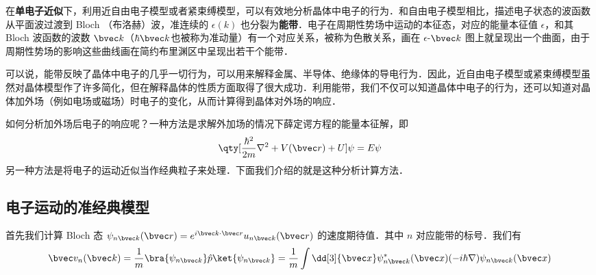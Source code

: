 
在\textbf{单电子近似}下，利用近自由电子模型或者紧束缚模型，可以有效地分析晶体中电子的行为．和自由电子模型相比，描述电子状态的波函数从平面波过渡到 Bloch （布洛赫）波，准连续的 $\epsilon(k)$ 也分裂为\textbf{能带}．电子在周期性势场中运动的本征态，对应的能量本征值 $\epsilon$，和其 Bloch 波函数的波数 $\bvec k$（$\hbar \bvec k$也被称为准动量）有一个对应关系，被称为色散关系，画在 $\epsilon$-${\bvec k}$ 图上就呈现出一个曲面，由于周期性势场的影响这些曲线画在简约布里渊区中呈现出若干个能带．

可以说，能带反映了晶体中电子的几乎一切行为，可以用来解释金属、半导体、绝缘体的导电行为．因此，近自由电子模型或紧束缚模型虽然对晶体模型作了许多简化，但在解释晶体的性质方面取得了很大成功．利用能带，我们不仅可以知道晶体中电子的行为，还可以知道对晶体加外场（例如电场或磁场）时电子的变化，从而计算得到晶体对外场的响应．

如何分析加外场后电子的响应呢？一种方法是求解外加场的情况下薛定谔方程的能量本征解，即
\begin{equation}
\qty[\frac{\hbar^2}{2m}\nabla^2+V(\bvec r)+U]\psi = E\psi
\end{equation}
另一种方法是将电子的运动近似当作经典粒子来处理．下面我们介绍的就是这种分析计算方法．
\subsection{电子运动的准经典模型}
首先我们计算 Bloch 态 $\psi_{n\bvec k}(\bvec r)=e^{i\bvec k\cdot \bvec r}u_{n\bvec k}(\bvec r)$ 的速度期待值．其中 $n$ 对应能带的标号．我们有
\begin{equation}
\bvec v_n(\bvec k)=\frac{1}{m}\bra{\psi_{n\bvec k}}\hat p\ket{\psi_{n\bvec k}}=\frac{1}{m}\int \dd[3]{\bvec x}\psi_{n\bvec k}^*(\bvec x)(-i\hbar\nabla)\psi_{n\bvec k}(\bvec x)
\end{equation}
 
